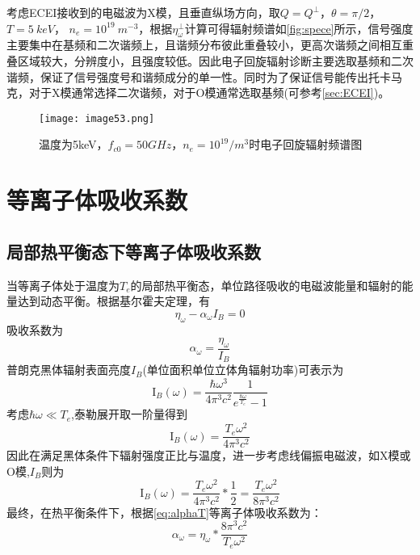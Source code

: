 考虑ECEI接收到的电磁波为X模，且垂直纵场方向，取$Q=Q^⊥$，$θ=π/2$，$T=5~keV$， $n_e=10^{19}~m^{-3}$，根据$η_\omega^⊥$计算可得辐射频谱如\autoref{fig:spece}所示，信号强度主要集中在基频和二次谐频上，且谐频分布彼此重叠较小，更高次谐频之间相互重叠区域较大，分辨度小，且强度较低。因此电子回旋辐射诊断主要选取基频和二次谐频，保证了信号强度号和谐频成分的单一性。同时为了保证信号能传出托卡马克，对于X模通常选择二次谐频，对于O模通常选取基频(可参考\autoref{sec:ECEI})。
\begin{figure}
\centering
\texttt{[image: image53.png]}
\caption{\label{fig:spece}温度为5keV，$f_{c0}=50GHz$，$n_e=10^{19}/m^3$时电子回旋辐射频谱图}

\end{figure}
\clearpage
\section{等离子体吸收系数}
\subsection{局部热平衡态下等离子体吸收系数}
当等离子体处于温度为$T_e$的局部热平衡态，单位路径吸收的电磁波能量和辐射的能量达到动态平衡。根据基尔霍夫定理，有
\begin{equation}
\eta_{\omega}-\alpha_{\omega} I_B=0
\end{equation}
吸收系数为
\begin{equation}\label{eq:alphaT}
\alpha_{\omega}=\frac{\eta_{\omega}}{I_B}
\end{equation}
普朗克黑体辐射表面亮度$I_B$(单位面积单位立体角辐射功率)可表示为
\begin{equation}
\mathrm{I}_{B}(\omega)=\frac{\hbar \omega^{3}}{4 \pi^{3} c^{2}} \frac{1}{e^{\frac{\hbar \omega}{T_{e}}}-1}
\end{equation}
考虑$ℏω≪T_e$,泰勒展开取一阶量得到
\begin{equation}\label{eq:Black}
\mathrm{I}_{B}(\omega)=\frac{T_{e} \omega^{2}}{4 \pi^{3} c^{2}}
\end{equation}
因此在满足黑体条件下辐射强度正比与温度，进一步考虑线偏振电磁波，如X模或O模,$I_B$则为
\begin{equation}
\mathrm{I}_{B}(\omega)=\frac{T_{e} \omega^{2}}{4 \pi^{3} c^{2}} * \frac{1}{2}=\frac{T_{e} \omega^{2}}{8 \pi^{3} c^{2}}
\end{equation}
最终，在热平衡条件下，根据\autoref{eq:alphaT}等离子体吸收系数为：
\begin{equation}\label{eq:alphaT2}
\alpha_{\omega}=\eta_{\omega} * \frac{8 \pi^{3} c^{2}}{T_{e} \omega^{2}}
\end{equation}

